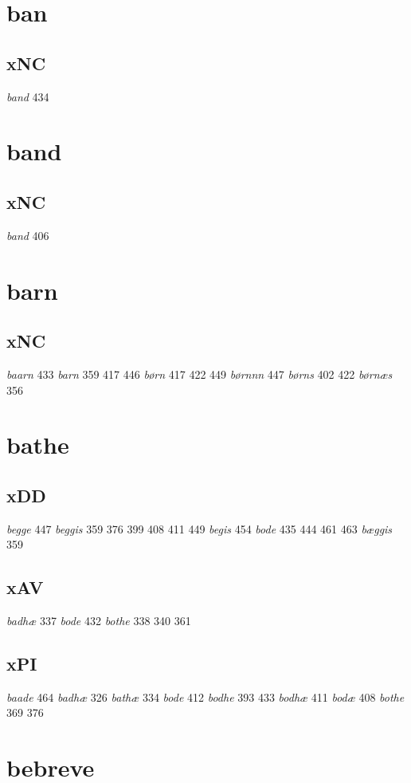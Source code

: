 \documentclass[a4paper,twocolumn]{article}
\begin{document}
\section{ban}
\label{sec:org5cfbeb7}
\subsection{xNC}
\label{sec:org3f52400}
\emph{band} 434 
\section{band}
\label{sec:org88826e9}
\subsection{xNC}
\label{sec:org7366b21}
\emph{band} 406 
\section{barn}
\label{sec:orga6f426b}
\subsection{xNC}
\label{sec:org1e10612}
\emph{baarn} 433 \emph{barn} 359 417 446 \emph{børn} 417 422 449 \emph{børnnn} 447 \emph{børns} 402 422 \emph{børnæs} 356 
\section{bathe}
\label{sec:org426c2b6}
\subsection{xDD}
\label{sec:orga5b453d}
\emph{begge} 447 \emph{beggis} 359 376 399 408 411 449 \emph{begis} 454 \emph{bode} 435 444 461 463 \emph{bæggis} 359 
\subsection{xAV}
\label{sec:orge0fed0f}
\emph{badhæ} 337 \emph{bode} 432 \emph{bothe} 338 340 361 
\subsection{xPI}
\label{sec:orga3d1532}
\emph{baade} 464 \emph{badhæ} 326 \emph{bathæ} 334 \emph{bode} 412 \emph{bodhe} 393 433 \emph{bodhæ} 411 \emph{bodæ} 408 \emph{bothe} 369 376 
\section{bebreve}
\label{sec:org414558c}
\end{document}
